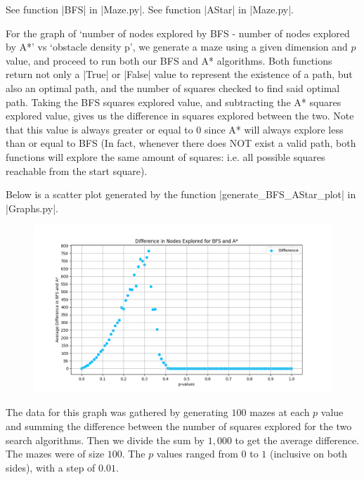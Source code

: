 \documentclass[12pt, twoside]{article}
\begin{document}
\begin{enumerate}
        \vspace{4mm}
        See function \cverb|BFS| in \cverb|Maze.py|. See function \cverb|AStar| in \cverb|Maze.py|.

        \vspace{4mm}
        For the graph of `number of nodes explored by BFS - number of nodes explored by A*' vs `obstacle density p', we generate a maze using a given dimension and $p$ value, and proceed to run both our BFS and A* algorithms. Both functions return not only a \cverb|True| or \cverb|False| value to represent the existence of a path, but also an optimal path, and the number of squares checked to find said optimal path. Taking the BFS squares explored value, and subtracting the A* squares explored value, gives us the difference in squares explored between the two. Note that this value is always greater or equal to 0 since A* will always explore less than or equal to BFS (In fact, whenever there does NOT exist a valid path, both functions will explore the same amount of squares: i.e. all possible squares reachable from the start square).  

        Below is a scatter plot generated by the function \cverb|generate_BFS_AStar_plot| in \\ \cverb|Graphs.py|.

        \begin{figure}[h]
            \centering
            \includegraphics[scale = 0.6]{BFS_AStar_scatter.png}
        \end{figure}

        The data for this graph was gathered by generating $100$ mazes at each $p$ value and summing the difference between the number of squares explored for the two search algorithms. Then we divide the sum by $1,000$ to get the average difference. The mazes were of size $100$. The $p$ values ranged from $0$ to $1$ (inclusive on both sides), with a step of $0.01$.


\end{enumerate}
\end{document}
